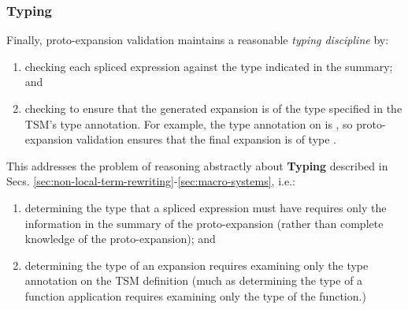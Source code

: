 \vspace{-8px}
\subsubsection{Typing}\vspace{-4px}
Finally, proto-expansion validation maintains a reasonable \emph{typing discipline} by:
\begin{enumerate}
\item checking each spliced expression against the type indicated in the summary; and 
\item checking to ensure that the generated expansion is of the type specified in the TSM's type annotation. For example, the type annotation on  is , so proto-expansion validation ensures that the final expansion is of type .
\end{enumerate}

 This addresses the problem of reasoning abstractly about \textbf{Typing} described in Secs. \ref{sec:non-local-term-rewriting}-\ref{sec:macro-systems}, i.e.:
 \begin{enumerate}
 \item determining the type that a spliced expression must have requires only the information in the summary of the proto-expansion (rather than complete knowledge of the proto-expansion); and 
 \item determining the type of an expansion requires examining only the type annotation on the TSM definition (much as determining the type of a function application requires examining only the type of the function.)
 \end{enumerate}





